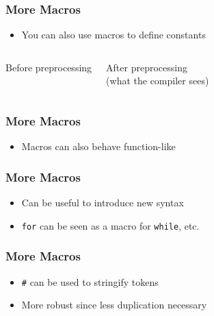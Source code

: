 \documentclass{../ucll-slides}
\begin{document}
\begin{frame}
  \frametitle{More Macros}
  \begin{itemize}
    \item You can also use macros to define constants
  \end{itemize}
  \begin{columns}[t]
    \column{5cm}
    \begin{center} Before preprocessing \end{center}
    \column{5cm}
    \begin{center} After preprocessing \\ (what the compiler sees) \end{center}
  \end{columns}
\end{frame}

\begin{frame}
  \frametitle{More Macros}
  \begin{itemize}
    \item Macros can also behave function-like
  \end{itemize}
  \begin{overprint}
  \end{overprint}
\end{frame}

\begin{frame}
  \frametitle{More Macros}
  \begin{itemize}
    \item Can be useful to introduce new syntax
    \item {\tt for} can be seen as a macro for {\tt while}, etc.
  \end{itemize}
  \begin{overprint}
  \end{overprint}
\end{frame}

\begin{frame}
  \frametitle{More Macros}
  \begin{itemize}
    \item {\tt \#} can be used to stringify tokens
    \item More robust since less duplication necessary
  \end{itemize}
  \begin{overprint}
  \end{overprint}
\end{frame}
\end{document}
